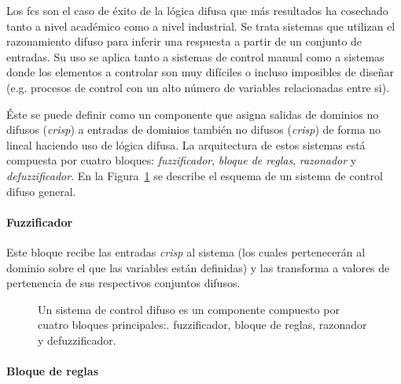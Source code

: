 Los \acrfull{fcs} son el caso de éxito de la lógica difusa que más resultados ha cosechado tanto a nivel académico como a nivel industrial. Se trata sistemas que utilizan el razonamiento difuso para inferir una respuesta a partir de un conjunto de entradas. Su uso se aplica tanto a sistemas de control manual como a sistemas donde los elementos a controlar son muy difíciles o incluso imposibles de diseñar (e.g. procesos de control con un alto número de variables relacionadas entre si).

Éste se puede definir como un componente que asigna salidas de dominios no difusos (\textit{crisp}) a entradas de dominios también no difusos (\textit{crisp}) de forma no lineal haciendo uso de lógica difusa. La arquitectura de estos sistemas está compuesta por cuatro bloques: \textit{fuzzificador}, \textit{bloque de reglas}, \textit{razonador} y \textit{defuzzificador}. En la Figura~\ref{fig:fuzzy-control-system} se describe el esquema de un sistema de control difuso general.

\paragraph{Fuzzificador}

Este bloque recibe las entradas \textit{crisp} al sistema (los cuales pertenecerán al dominio sobre el que las variables están definidas) y las transforma a valores de pertenencia de sus respectivos conjuntos difusos.

\begin{figure}[t]
	\centering
	\caption[Esquema de un sistema de control difuso]{Un sistema de control difuso es un componente compuesto por cuatro bloques principales:. fuzzificador, bloque de reglas, razonador y defuzzificador.}
	\label{fig:fuzzy-control-system}
\end{figure}

\paragraph{Bloque de reglas}


